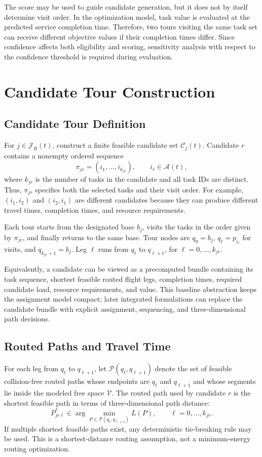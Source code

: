 \documentclass[conference]{IEEEtran}
\begin{document}
The score may be used to guide candidate generation, but it does not by itself determine visit order. In the optimization model, task value is evaluated at the predicted service completion time. Therefore, two tours visiting the same task set can receive different objective values if their completion times differ. Since confidence affects both eligibility and scoring, sensitivity analysis with respect to the confidence threshold is required during evaluation.

\section{Candidate Tour Construction}
\subsection{Candidate Tour Definition}
For $j\in\mathcal J_R(t)$, construct a finite feasible candidate set $\mathcal C_j(t)$. Candidate $r$ contains a nonempty ordered sequence
\begin{equation}
\pi_{jr}=(i_1,\ldots,i_{k_{jr}}),\qquad i_\ell\in\mathcal A(t),
\end{equation}
where $k_{jr}$ is the number of tasks in the candidate and all task IDs are distinct. Thus, $\pi_{jr}$ specifies both the selected tasks and their visit order. For example, $(i_1,i_2)$ and $(i_2,i_1)$ are different candidates because they can produce different travel times, completion times, and resource requirements.

Each tour starts from the designated base $b_j$, visits the tasks in the order given by $\pi_{jr}$, and finally returns to the same base. Tour nodes are $q_0=b_j$, $q_\ell=p_{i_\ell}$ for visits, and $q_{k_{jr}+1}=b_j$. Leg $\ell$ runs from $q_\ell$ to $q_{\ell+1}$, for $\ell=0,\ldots,k_{jr}$.

Equivalently, a candidate can be viewed as a precomputed bundle containing its task sequence, shortest feasible routed flight legs, completion times, required candidate load, resource requirements, and value. This baseline abstraction keeps the assignment model compact; later integrated formulations can replace the candidate bundle with explicit assignment, sequencing, and three-dimensional path decisions.

\subsection{Routed Paths and Travel Time}
For each leg from $q_\ell$ to $q_{\ell+1}$, let $\mathcal P(q_\ell,q_{\ell+1})$ denote the set of feasible collision-free routed paths whose endpoints are $q_\ell$ and $q_{\ell+1}$ and whose segments lie inside the modeled free space $\mathcal V$. The routed path used by candidate $r$ is the shortest feasible path in terms of three-dimensional path distance:
\begin{equation}
P^*_{jr\ell}\in
\arg\min_{P\in\mathcal P(q_\ell,q_{\ell+1})} L(P),
\qquad \ell=0,\ldots,k_{jr}.
\end{equation}
If multiple shortest feasible paths exist, any deterministic tie-breaking rule may be used. This is a shortest-distance routing assumption, not a minimum-energy routing optimization.
\end{document}
